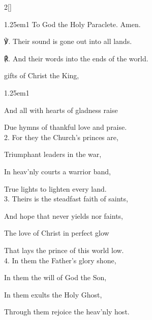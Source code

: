 \begin{paracol}{2}[]
\begin{hangparas}{1.25em}{1}
To God the Holy Paraclete. Amen.\\
\end{hangparas}

℣. Their sound is gone out into all lands.

℟. And their words into the ends of the world.


\switchcolumn

\mattins


\vspace{-1\baselineskip}

\mattinsInvitatoryHymn\label{ApostlesInvitatory}

 gifts of Christ the King,


\begin{hangparas}{1.25em}{1}

And all with hearts of gladness raise

Due hymns of thankful love and praise.\\

2. For they the Church's princes are,

Triumphant leaders in the war,

In heav'nly courts a warrior band,

True lights to lighten every land.\\

3. Theirs is the steadfast faith of saints,

And hope that never yields nor faints,

The love of Christ in perfect glow

That lays the prince of this world low.\\

4. In them the Father's glory shone,

In them the will of God the Son,

In them exults the Holy Ghost,

Through them rejoice the heav'nly host.\\


\end{hangparas}
\end{paracol}
